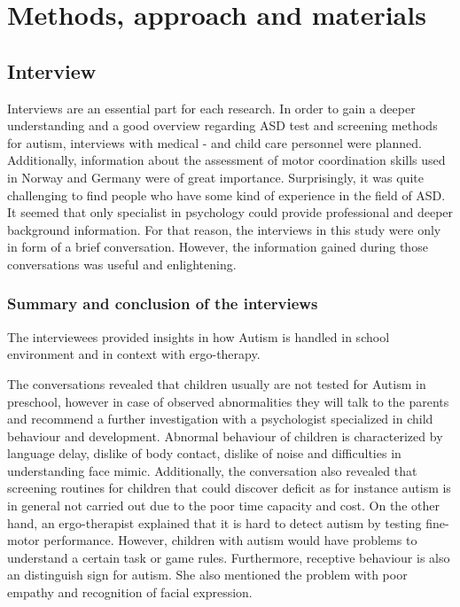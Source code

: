 \chapter{Methods, approach and materials}
\label{chap:methods}


\section{Interview}
\label{sec:interview}
Interviews are an essential part for each research. In order to gain a deeper understanding and a good overview regarding ASD test and screening methods for autism, interviews with medical - and child care personnel were planned. Additionally, information about the assessment of motor coordination skills used in Norway and Germany were of great importance.
Surprisingly, it was quite challenging to find people who have some kind of experience in the field of ASD. It seemed that only specialist in psychology could provide professional and deeper background information. For that reason, the interviews in this study were only in form of a brief conversation. However, the information gained during those conversations was useful and enlightening.


\subsection{Summary and conclusion of the interviews}

The interviewees provided insights in how Autism is handled in school environment and in context with ergo-therapy.  

The conversations revealed that children usually are not tested for Autism in preschool, however in case of observed abnormalities they will talk to the parents and recommend a further investigation with a psychologist specialized in child behaviour and development. Abnormal behaviour of children is characterized by language delay, dislike of body contact, dislike of noise and difficulties in understanding face mimic.
Additionally, the conversation also revealed that screening routines for children that could discover deficit as for instance autism is in general not carried out due to the poor time capacity and cost.
On the other hand, an ergo-therapist explained that it is hard to detect autism by testing fine-motor performance. However, children with autism would have problems to understand a certain task or game rules. Furthermore, receptive behaviour is also an distinguish sign for autism.
She also mentioned the problem with poor empathy and recognition of facial expression.

